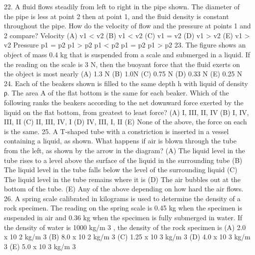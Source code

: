 22. A fluid flows steadily from left to right in the pipe
shown. The diameter of the pipe is less at point 2 then at
point 1, and the fluid density is constant throughout the
pipe. How do the velocity of flow and the pressure at
points 1 and 2 compare?
Velocity
(A) v1 < v2
(B) v1 < v2
(C) v1 = v2
(D) v1 > v2
(E) v1 > v2
Pressure
p1 = p2
p1 > p2
p1 < p2
p1 = p2
p1 > p2
23. The figure shows an object of mass 0.4 kg that is suspended from a scale and submerged in
a liquid. If the reading on the scale is 3 N, then the buoyant force that the fluid exerts on
the object is most nearly
(A) 1.3 N
(B) 1.0N
(C) 0.75 N
(D) 0.33 N
(E) 0.25 N
24. Each of the beakers shown is filled to the same depth h with liquid
of density ρ. The area A of the flat bottom is the same for each
beaker. Which of the following ranks the beakers according to the
net downward force exerted by the liquid on the flat bottom, from
greatest to least force?
(A) I, III, II, IV
(B) I, IV, III, II
(C) II, III, IV, I
(D) IV, III, I, II
(E) None of the above, the force on each is the same.
25. A T-shaped tube with a constriction is inserted in a vessel containing a
liquid, as shown. What happens if air is blown through the tube from the
left, as shown by the arrow in the diagram?
(A) The liquid level in the tube rises to a level above the surface of the
liquid in the surrounding tube
(B) The liquid level in the tube falls below the level of the surrounding
liquid
(C) The liquid level in the tube remains where it is
(D) The air bubbles out at the bottom of the tube.
(E) Any of the above depending on how hard the air flows.
26. A spring scale calibrated in kilograms is used to determine the density of a rock specimen. The reading on the
spring scale is 0.45 kg when the specimen is suspended in air and 0.36 kg when the specimen is fully
submerged in water. If the density of water is 1000 kg/m 3 , the density of the rock specimen is
(A) 2.0 x 10 2 kg/m 3 (B) 8.0 x 10 2 kg/m 3 (C) 1.25 x 10 3 kg/m 3 (D) 4.0 x 10 3 kg/m 3 (E) 5.0 x 10 3 kg/m 3



